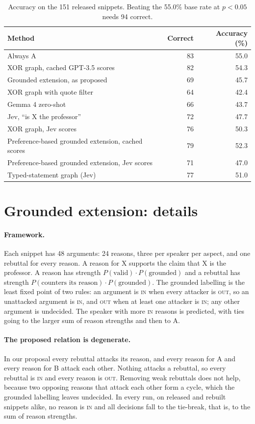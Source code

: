 \documentclass[11pt]{article}
\begin{document}
\begin{table}[h]
\centering\small
\begin{tabular}{lrr}
\toprule
Method & Correct & Accuracy (\%) \\
\midrule
Always A & 83 & 55.0 \\
XOR graph, cached GPT-3.5 scores & 82 & 54.3 \\
Grounded extension, as proposed & 69 & 45.7 \\
XOR graph with quote filter & 64 & 42.4 \\
Gemma 4 zero-shot & 66 & 43.7 \\
Jev, ``is X the professor'' & 72 & 47.7 \\
XOR graph, Jev scores & 76 & 50.3 \\
Preference-based grounded extension, cached scores & 79 & 52.3 \\
Preference-based grounded extension, Jev scores & 71 & 47.0 \\
Typed-statement graph (Jev) & 77 & 51.0 \\
\bottomrule
\end{tabular}
\caption{Accuracy on the 151 released snippets. Beating the 55.0\% base rate at $p<0.05$ needs 94 correct.}
\label{tab:released}
\end{table}

\section{Grounded extension: details}
\label{sec:grounded}

\paragraph{Framework.}
Each snippet has 48 arguments: 24 reasons, three per speaker per aspect, and one rebuttal for every reason.
A reason for X supports the claim that X is the professor.
A reason has strength $P(\textrm{valid})\cdot P(\textrm{grounded})$ and a rebuttal has strength $P(\textrm{counters its reason})\cdot P(\textrm{grounded})$.
The grounded labelling is the least fixed point of two rules: an argument is \textsc{in} when every attacker is \textsc{out}, so an unattacked argument is \textsc{in}, and \textsc{out} when at least one attacker is \textsc{in}; any other argument is undecided.
The speaker with more \textsc{in} reasons is predicted, with ties going to the larger sum of reason strengths and then to A.

\paragraph{The proposed relation is degenerate.}
In our proposal every rebuttal attacks its reason, and every reason for A and every reason for B attack each other.
Nothing attacks a rebuttal, so every rebuttal is \textsc{in} and every reason is \textsc{out}.
Removing weak rebuttals does not help, because two opposing reasons that attack each other form a cycle, which the grounded labelling leaves undecided.
In every run, on released and rebuilt snippets alike, no reason is \textsc{in} and all decisions fall to the tie-break, that is, to the sum of reason strengths.
\end{document}
